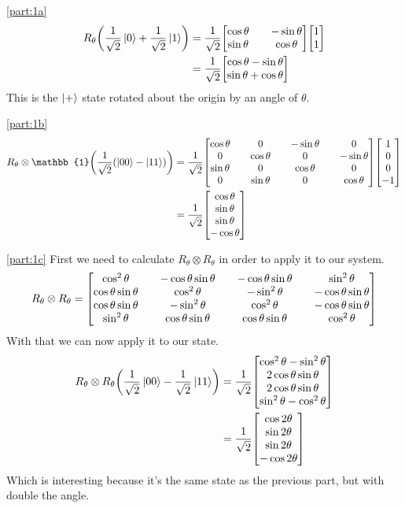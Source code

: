 \documentclass[boxes,pages]{homework}
\begin{document}
\begin{solution}
	\ref{part:1a}
	\begin{align*}
		R_\theta\qty(\frac{1}{\sqrt{2}}\ket{0} + \frac{1}{\sqrt{2}}\ket{1}) &= \frac{1}{\sqrt{2}}\mqty[\cos{\theta} && -\sin{\theta} \\ \sin{\theta} && \cos{\theta}]\mqty[1 \\ 1] \\
		&= \frac{1}{\sqrt{2}}\mqty[\cos\theta - \sin\theta \\ \sin\theta + \cos\theta]
	\end{align*}
	This is the $\ket{+}$ state rotated about the origin by an angle of $\theta$.

	\ref{part:1b}
	\begin{align*}
		R_\theta\otimes\mathbb{1} \qty(\frac{1}{\sqrt{2}}\qty(\ket{00} - \ket{11})) & = \frac{1}{\sqrt{2}}\mqty[\cos\theta && 0 && -\sin\theta && 0 \\ 0 && \cos\theta && 0 && -\sin\theta \\ \sin\theta && 0 && \cos\theta && 0 \\ 0 &&\sin\theta &&  0 && \cos\theta]\mqty[1 \\ 0 \\ 0 \\ -1] \\
		&= \frac{1}{\sqrt{2}}\mqty[\cos\theta \\ \sin\theta \\ \sin\theta \\ -\cos\theta]
	\end{align*}

	\ref{part:1c}
	First we need to calculate $R_\theta\otimes R_\theta$ in order to apply it to our system.
	\begin{equation*}
		R_\theta\otimes R_\theta = \mqty[\cos^2\theta && -\cos\theta\sin\theta && -\cos\theta\sin\theta && \sin^2\theta \\ \cos\theta\sin\theta && \cos^2\theta && -\sin^2\theta && -\cos\theta\sin\theta \\ \cos\theta\sin\theta && -\sin^2\theta && \cos^2\theta && -\cos\theta\sin\theta \\ \sin^2\theta && \cos\theta\sin\theta && \cos\theta\sin\theta && \cos^2\theta]
	\end{equation*}
	With that we can now apply it to our state.
	\begin{align*}
		R_\theta\otimes R_\theta\qty(\frac{1}{\sqrt{2}}\ket{00} - \frac{1}{\sqrt{2}}\ket{11}) & = \frac{1}{\sqrt{2}}\mqty[\cos^2\theta - \sin^2\theta \\ 2\cos\theta\sin\theta \\ 2\cos\theta\sin\theta \\ \sin^2\theta - \cos^2\theta] \\
		                                                                                      & = \frac{1}{\sqrt{2}}\mqty[\cos 2\theta                \\ \sin 2\theta \\ \sin 2\theta \\ -\cos 2\theta]
	\end{align*}
	Which is interesting because it's the same state as the previous part, but with double the angle.


\end{solution}
\end{document}
